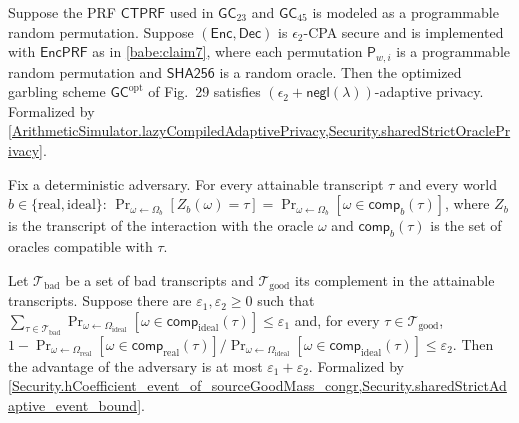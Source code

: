 \begin{paperthm}\label{babe:thm8}
Suppose the PRF $\mathsf{CTPRF}$ used in $\mathsf{GC}_{23}$ and $\mathsf{GC}_{45}$ is modeled as a programmable random permutation.
Suppose $(\mathsf{Enc}, \mathsf{Dec})$ is $\epsilon_2$-CPA secure and is implemented with $\mathsf{EncPRF}$ as in \cref{babe:claim7}, where each permutation $\mathsf{P}_{w,i}$ is a programmable random permutation and $\mathsf{SHA256}$ is a random oracle.
Then the optimized garbling scheme $\mathsf{GC}^{\mathrm{opt}}$ of Fig.~29 satisfies $(\epsilon_2 + \mathsf{negl}(\lambda))$-adaptive privacy.
Formalized by \cref{ArithmeticSimulator.lazyCompiledAdaptivePrivacy,Security.sharedStrictOraclePrivacy}.
\end{paperthm}

\begin{paperlem}\label{babe:lem12}
Fix a deterministic adversary.
For every attainable transcript $\tau$ and every world $b \in \{\mathrm{real}, \mathrm{ideal}\}$: $\Pr_{\omega \gets \Omega_b}[Z_b(\omega) = \tau] = \Pr_{\omega \gets \Omega_b}[\omega \in \mathsf{comp}_b(\tau)]$, where $Z_b$ is the transcript of the interaction with the oracle $\omega$ and $\mathsf{comp}_b(\tau)$ is the set of oracles compatible with $\tau$.
\end{paperlem}

\begin{paperlem}\label{babe:lem13}
Let $\mathcal{T}_{\mathrm{bad}}$ be a set of bad transcripts and $\mathcal{T}_{\mathrm{good}}$ its complement in the attainable transcripts.
Suppose there are $\varepsilon_1, \varepsilon_2 \geq 0$ such that
$\sum_{\tau \in \mathcal{T}_{\mathrm{bad}}} \Pr_{\omega \gets \Omega_{\mathrm{ideal}}}[\omega \in \mathsf{comp}_{\mathrm{ideal}}(\tau)] \leq \varepsilon_1$ and, for every $\tau \in \mathcal{T}_{\mathrm{good}}$,
$1 - \Pr_{\omega \gets \Omega_{\mathrm{real}}}[\omega \in \mathsf{comp}_{\mathrm{real}}(\tau)] / \Pr_{\omega \gets \Omega_{\mathrm{ideal}}}[\omega \in \mathsf{comp}_{\mathrm{ideal}}(\tau)] \leq \varepsilon_2$.
Then the advantage of the adversary is at most $\varepsilon_1 + \varepsilon_2$.
Formalized by \cref{Security.hCoefficient_event_of_sourceGoodMass_congr,Security.sharedStrictAdaptive_event_bound}.
\end{paperlem}

